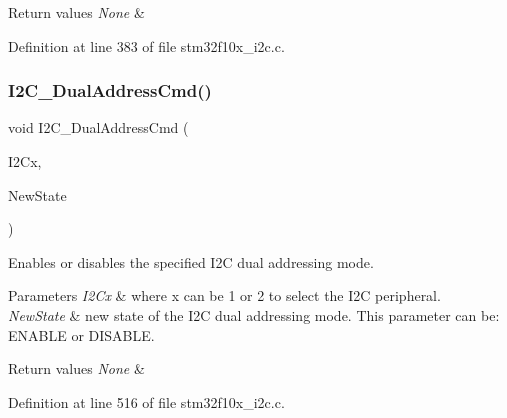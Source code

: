 \begin{DoxyRetVals}{Return values}
{\em None} & \\
\hline
\end{DoxyRetVals}


Definition at line 383 of file stm32f10x\+\_\+i2c.\+c.

\mbox{\label{group___i2_c___exported___functions_ga02145a333a56e79557d6ef4ea03fc313}} 
\subsubsection{\texorpdfstring{I2\+C\+\_\+\+Dual\+Address\+Cmd()}{I2C\_DualAddressCmd()}}
{\footnotesize\ttfamily void I2\+C\+\_\+\+Dual\+Address\+Cmd (\begin{DoxyParamCaption}\item[{\hyperlink{struct_i2_c___type_def}{I2\+C\+\_\+\+Type\+Def} $\ast$}]{I2\+Cx,  }\item[{\hyperlink{group___exported__types_gac9a7e9a35d2513ec15c3b537aaa4fba1}{Functional\+State}}]{New\+State }\end{DoxyParamCaption})}



Enables or disables the specified I2C dual addressing mode. 


\begin{DoxyParams}{Parameters}
{\em I2\+Cx} & where x can be 1 or 2 to select the I2C peripheral. \\
\hline
{\em New\+State} & new state of the I2C dual addressing mode. This parameter can be\+: E\+N\+A\+B\+LE or D\+I\+S\+A\+B\+LE. \\
\hline
\end{DoxyParams}

\begin{DoxyRetVals}{Return values}
{\em None} & \\
\hline
\end{DoxyRetVals}


Definition at line 516 of file stm32f10x\+\_\+i2c.\+c.

\mbox{\label{group___i2_c___exported___functions_gaa570f76bc34e5b0531b29b1a90af1275}} 
